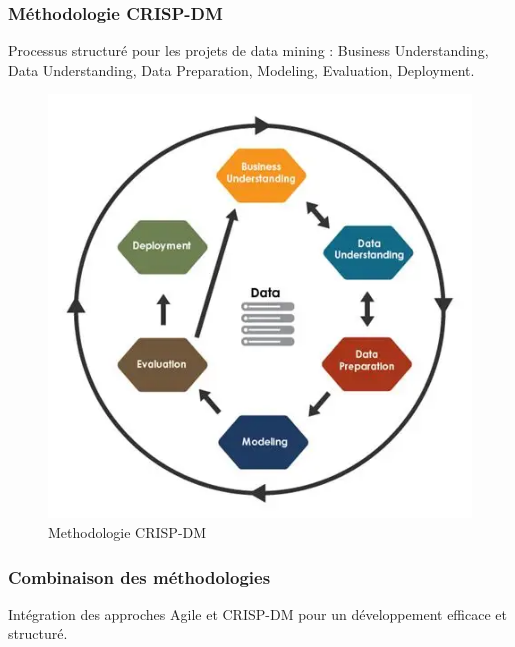 \subsubsection{Méthodologie CRISP-DM}
Processus structuré pour les projets de data mining : Business Understanding, Data Understanding, Data Preparation, Modeling, Evaluation, Deployment.
\begin{figure}[H]
    \centering
    \includegraphics[width=\figwidth]{img/Methodologie CRISP-DM.png}
    \caption{Methodologie CRISP-DM}
    \label{fig:Methodologie CRISP-DM}
\end{figure}

\subsubsection{Combinaison des méthodologies}
Intégration des approches Agile et CRISP-DM pour un développement efficace et structuré.



